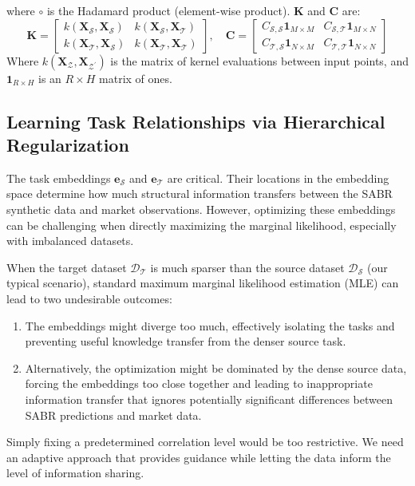 \documentclass[preprint,12pt]{elsarticle}
\begin{document}
where $\circ$ is the Hadamard product (element-wise product). $\mathbf{K}$ and $\mathbf{C}$ are:
\begin{equation}
    \mathbf{K} =
    \begin{bmatrix}
    k(\mathbf{X}_\mathcal{S},\mathbf{X}_\mathcal{S}) & k(\mathbf{X}_\mathcal{S},\mathbf{X}_\mathcal{T}) \\
    k(\mathbf{X}_\mathcal{T},\mathbf{X}_\mathcal{S}) & k(\mathbf{X}_\mathcal{T},\mathbf{X}_\mathcal{T})
    \end{bmatrix}, \quad
    \mathbf{C} =
    \begin{bmatrix}
    C_\mathcal{S,S}\mathbf{1}_{M\times M} & C_\mathcal{S,T}\mathbf{1}_{M\times N} \\
    C_\mathcal{T,S}\mathbf{1}_{N\times M} & C_\mathcal{T,T}\mathbf{1}_{N\times N}
    \end{bmatrix}
\end{equation}
Where $k(\mathbf{X}_\mathcal{Z},\mathbf{X}_\mathcal{Z^\prime})$ is the matrix of kernel evaluations between input points, and $\mathbf{1}_{R\times H}$ is an $R \times H$ matrix of ones.


\subsection{Learning Task Relationships via Hierarchical Regularization}

The task embeddings $\mathbf{e}_\mathcal{S}$ and $\mathbf{e}_\mathcal{T}$ are critical. Their locations in the embedding space determine how much structural information transfers between the SABR synthetic data and market observations. However, optimizing these embeddings can be challenging when directly maximizing the marginal likelihood, especially with imbalanced datasets.

When the target dataset $\mathcal{D}_\mathcal{T}$ is much sparser than the source dataset $\mathcal{D}_\mathcal{S}$ (our typical scenario), standard maximum marginal likelihood estimation (MLE) can lead to two undesirable outcomes:
\begin{enumerate}
    \item The embeddings might diverge too much, effectively isolating the tasks and preventing useful knowledge transfer from the denser source task.
    \item Alternatively, the optimization might be dominated by the dense source data, forcing the embeddings too close together and leading to inappropriate information transfer that ignores potentially significant differences between SABR predictions and market data.
\end{enumerate}
Simply fixing a predetermined correlation level would be too restrictive. We need an adaptive approach that provides guidance while letting the data inform the level of information sharing.
\end{document}
